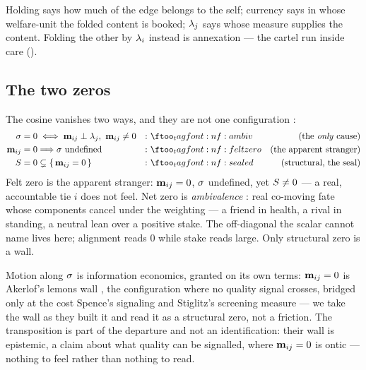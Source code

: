 \documentclass[../main]{subfiles}
\begin{document}
Holding says how much of the edge belongs to the self; currency says in whose welfare-unit
the folded content is booked; $\lambda\sb{j}$ says whose measure supplies the content.
Folding the other by $\lambda\sb{i}$ instead is annexation  --- the
cartel run inside care ().

\subsection{The two zeros}
\label{subsec:ont:zeros}
%
The cosine vanishes two ways, and they are not one configuration :
\begin{align}
  \leanbare = 0 &\iff \caringcovector{i}{j} \perp \feelingcovector{j},\ \caringcovector{i}{j} \neq 0
    &:& \eqtag{f:ambiv}{the \emph{only} cause}\\
  \caringcovector{i}{j} = 0   &\Longrightarrow \leanbare\ \text{undefined}
    &:& \eqtag{f:feltzero}{the apparent stranger}\\
  \comovfield = 0         &\subsetneq \{\,\caringcovector{i}{j} = 0\,\}
    &:& \eqtag{f:sealed}{structural, the seal}
\end{align}
Felt zero  is the apparent stranger: $\mathbf{m}\sb{ ij }=0$,
$\sigma$ undefined, yet $S\neq0$ --- a real, accountable tie $i$ does not
feel. Net zero is \emph{ambivalence} : real co-moving fate whose
components cancel under the weighting --- a friend in health, a rival in standing, a neutral
lean over a positive stake. The off-diagonal the scalar cannot name lives here; alignment
reads $0$ while stake reads large. Only structural zero is a wall.

\begin{econ}[label=e:lemons, title={The lemons wall}, ref=f:feltzero,
  cites={a:lemons,a:signaling,a:screening}, departs=wall,
  stopsat={takes the no-signal wall as built; reads it as a structural zero, not a friction}]
  Motion along $\sigma$ is information economics, granted on its own terms:
  $\mathbf{m}\sb{ ij }=0$ is
  Akerlof's lemons wall \parencite{a:lemons}, the configuration where no quality signal
  crosses, bridged only at the cost Spence's signaling \parencite{a:signaling} and Stiglitz's
  screening \parencite{a:screening} measure --- we take the wall as they built it and read it
  as a structural zero, not a friction. The transposition is part of the departure and not
  an identification: their wall is epistemic, a claim about what quality can be signalled,
  where $\mathbf{m}\sb{ ij }=0$ is ontic --- nothing to feel rather than nothing to read.
\end{econ}
\end{document}
